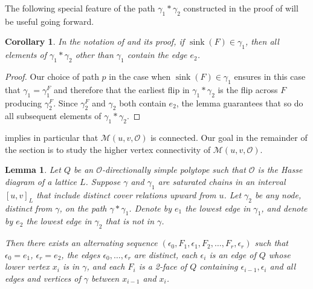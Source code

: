 \documentclass[12pt]{amsart}
\theoremstyle{plain}
\newtheorem{lem}[thm]{Lemma}
\newtheorem{cor}[thm]{Corollary}
\theoremstyle{definition}
\theoremstyle{remark}
\DeclareMathOperator{\sink}{sink}
\begin{document}
The following special feature of the path $\gamma_1 * \gamma_2$ constructed in the proof of  will be useful going forward.

\begin{cor}\label{cor:sink-lemma}
In the notation of  and its proof, if $\sink(F)\in \gamma_1$, then all elements of $\gamma_1 * \gamma_2$ other than $\gamma_1$ contain the edge $e_2$.
\end{cor}
\begin{proof}
Our choice of path $p$ in the case when $\sink (F)\in \gamma_1$ ensures in this case that $\gamma_1=\gamma_1^F$ and therefore that the earliest flip in $\gamma_1 * \gamma_2$ is the flip across $F$ producing $\gamma_2^F$. Since $\gamma_2^F$ and $\gamma_2$ both contain $e_2$, the lemma guarantees that so do all subsequent elements of $\gamma_1 * \gamma_2$. 
\end{proof}


 implies in particular that $\mathcal{M}(u,v,\mathcal{O})$ is connected. Our goal in the remainder of the section is to study the higher vertex connectivity of $\mathcal{M}(u,v,\mathcal{O})$. 


\begin{lem}\label{lem:unique-sequence}
Let $Q$ be an $\mathcal{O}$-directionally simple polytope such that $\mathcal{O}$ is the Hasse diagram of a lattice $L$.   Suppose  $\gamma $ and $\gamma_1$ are saturated chains in an interval $[u,v]_L$ that include distinct cover relations upward from $u$.  Let $\gamma_2$ be any node, distinct from $\gamma $, 
on the path $\gamma * \gamma_1$.   Denote by $e_1$  the lowest edge in $\gamma_1$, and denote by  $e_2$ the lowest edge in $\gamma_2$ that is  not in $\gamma$.  
  
Then there exists an  alternating sequence $(\epsilon_0,F_1,\epsilon_1,F_2,\dots ,F_r,\epsilon_r)$ such that  $\epsilon_0 = e_1$, $\epsilon_r = e_2$, the edges $\epsilon_0,\dots ,\epsilon_r$ are distinct, 
each  $\epsilon_i$ is an edge of $Q$ whose lower vertex $x_i$ is in $\gamma$,  and
 each $F_i$ is a 2-face of $Q$ containing  $\epsilon_{i-1}, \epsilon_i$ and  all edges and vertices of $\gamma$ between $x_{i-1}$ and $x_i$.
\end{lem}
\end{document}
